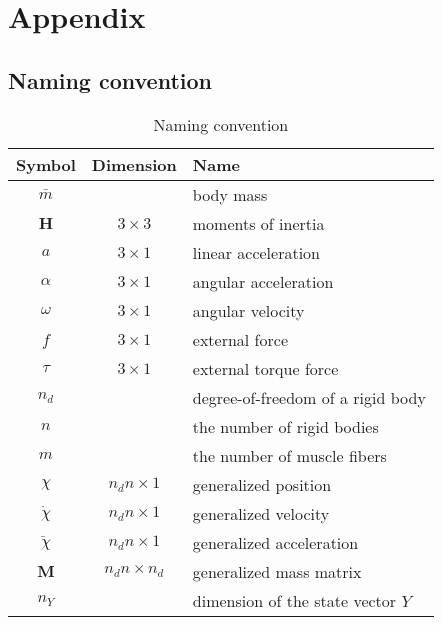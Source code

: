 \documentclass[a4paper,10pt]{article}
\begin{document}


\section{Appendix}

\subsection{Naming convention}
\begin{table}[h!b!p!]
\caption{Naming convention}
\centering
\begin{tabular}{ c c l }
\hline
Symbol           & Dimension                                & Name \\
\hline
$\bar{m}$        &                                          & body mass \\
$\mathbf{H}$     & $3 \times 3$                             & moments of inertia \\
$a$              & $3 \times 1$                             & linear acceleration \\
$\alpha$         & $3 \times 1$                             & angular acceleration \\
$\omega$         & $3 \times 1$                             & angular velocity \\
$f$              & $3 \times 1$                             & external force\\
$\tau$           & $3 \times 1$                             & external torque force\\
$n_d$            &                                          & degree-of-freedom of a rigid body\\
$n$              &                                          & the number of rigid bodies\\
$m$              &                                          & the number of muscle fibers\\
$\chi$           & $n_d n     \times 1$                     & generalized position\\
$\dot\chi$       & $n_d n     \times 1$                     & generalized velocity\\
$\ddot\chi$      & $n_d n     \times 1$                     & generalized acceleration\\
$\mathbf{M}$     & $n_d n     \times n_d$                   & generalized mass matrix\\
$n_Y$            &                                          & dimension of the state vector $Y$\\

\end{tabular}
\end{table}
\end{document}

